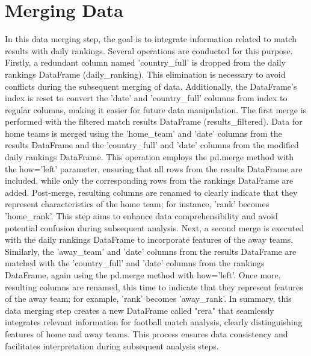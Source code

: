 \section{Merging Data}
In this data merging step, the goal is to integrate information related to match results with daily rankings. Several operations are conducted for this purpose.
Firstly, a redundant column named 'country\_full' is dropped from the daily rankings DataFrame (daily\_ranking). This elimination is necessary to avoid conflicts during the subsequent merging of data. Additionally, the DataFrame's index is reset to convert the 'date' and 'country\_full' columns from index to regular columns, making it easier for future data manipulation.
The first merge is performed with the filtered match results DataFrame (results\_filtered). Data for home teams is merged using the 'home\_team' and 'date' columns from the results DataFrame and the 'country\_full' and 'date' columns from the modified daily rankings DataFrame. This operation employs the pd.merge method with the how='left' parameter, ensuring that all rows from the results DataFrame are included, while only the corresponding rows from the rankings DataFrame are added.
Post-merge, resulting columns are renamed to clearly indicate that they represent characteristics of the home team; for instance, 'rank' becomes 'home\_rank'. This step aims to enhance data comprehensibility and avoid potential confusion during subsequent analysis.
Next, a second merge is executed with the daily rankings DataFrame to incorporate features of the away teams. Similarly, the 'away\_team' and 'date' columns from the results DataFrame are matched with the 'country\_full' and 'date' columns from the rankings DataFrame, again using the pd.merge method with how='left'.
Once more, resulting columns are renamed, this time to indicate that they represent features of the away team; for example, 'rank' becomes 'away\_rank'.
In summary, this data merging step creates a new DataFrame called "rera" that seamlessly integrates relevant information for football match analysis, clearly distinguishing features of home and away teams. This process ensures data consistency and facilitates interpretation during subsequent analysis steps.

